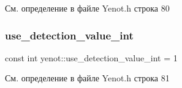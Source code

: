 См. определение в файле Yenot.\+h строка 80

\mbox{\label{namespaceyenot_a8ba9c1f83b4502a37417a016875a3918}} 
\subsubsection{\texorpdfstring{use\+\_\+detection\+\_\+value\+\_\+int}{use\_detection\_value\_int}}
{\footnotesize\ttfamily const int yenot\+::use\+\_\+detection\+\_\+value\+\_\+int = 1}



См. определение в файле Yenot.\+h строка 81

